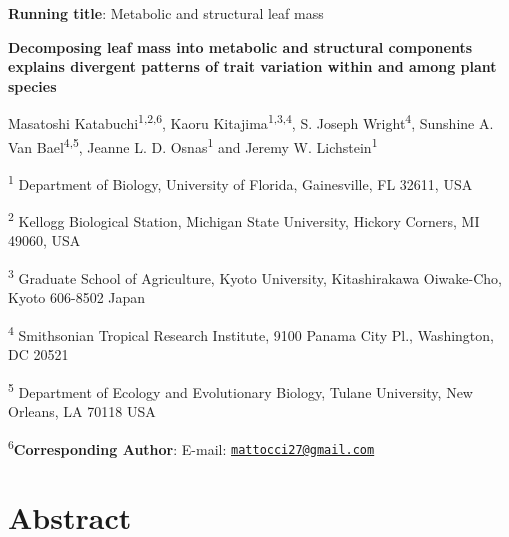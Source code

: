\documentclass[12pt,]{article}
\title{}
\author{}
\date{}
\theoremstyle{definition}
\theoremstyle{definition}
\theoremstyle{definition}
\theoremstyle{remark}
\begin{document}
\textbf{Running title}: Metabolic and structural leaf mass

\textbf{Decomposing leaf mass into metabolic and structural components
explains divergent patterns of trait variation within and among plant
species}

Masatoshi Katabuchi\textsuperscript{1,2,6}, Kaoru
Kitajima\textsuperscript{1,3,4}, S. Joseph Wright\textsuperscript{4},
Sunshine A. Van Bael\textsuperscript{4,5}, Jeanne L. D.
Osnas\textsuperscript{1} and Jeremy W. Lichstein\textsuperscript{1}

\textsuperscript{1} Department of Biology, University of Florida,
Gainesville, FL 32611, USA

\textsuperscript{2} Kellogg Biological Station, Michigan State
University, Hickory Corners, MI 49060, USA

\textsuperscript{3} Graduate School of Agriculture, Kyoto University,
Kitashirakawa Oiwake-Cho, Kyoto 606-8502 Japan

\textsuperscript{4} Smithsonian Tropical Research Institute, 9100 Panama
City Pl., Washington, DC 20521

\textsuperscript{5} Department of Ecology and Evolutionary Biology,
Tulane University, New Orleans, LA 70118 USA

\textsuperscript{6}\textbf{Corresponding Author}: E-mail:
\href{mailto:mattocci27@gmail.com}{\nolinkurl{mattocci27@gmail.com}}

\newpage

\hypertarget{abstract}{%
\section{Abstract}\label{abstract}}
\end{document}
